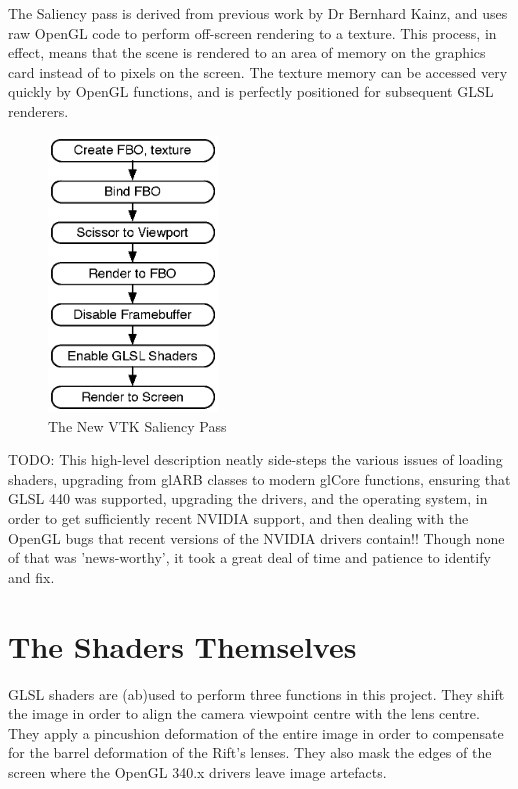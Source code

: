 \documentclass[MSc,paper=a4,pagesize=auto]{icldt}
\begin{document}
The Saliency pass is derived from previous work by Dr Bernhard Kainz, and uses raw OpenGL code to perform off-screen rendering to a texture. This process, in effect, means that the scene is rendered to an area of memory on the graphics card instead of to pixels on the screen. The texture memory can be accessed very quickly by OpenGL functions, and is perfectly positioned for subsequent GLSL renderers.

\begin{figure}[htbp!]
    \centering
    \includegraphics[width=0.4\textwidth]{resources/vtk_saliency}
    \caption{The New VTK Saliency Pass}
    \label{fig:vtk_saliency}
\end{figure}

TODO: This high-level description neatly side-steps the various issues of loading shaders, upgrading from glARB classes to modern glCore functions, ensuring that GLSL 440 was supported, upgrading the drivers, and the operating system, in order to get sufficiently recent NVIDIA support, and then dealing with the OpenGL bugs that recent versions of the NVIDIA drivers contain!! Though none of that was 'news-worthy', it took a great deal of time and patience to identify and fix. 

\section{The Shaders Themselves}
GLSL shaders are (ab)used to perform three functions in this project. They shift the image in order to align the camera viewpoint centre with the lens centre. They apply a pincushion deformation of the entire image in order to compensate for the barrel deformation of the Rift's lenses.  They also mask the edges of the screen where the OpenGL 340.x drivers leave image artefacts. 
\end{document}
